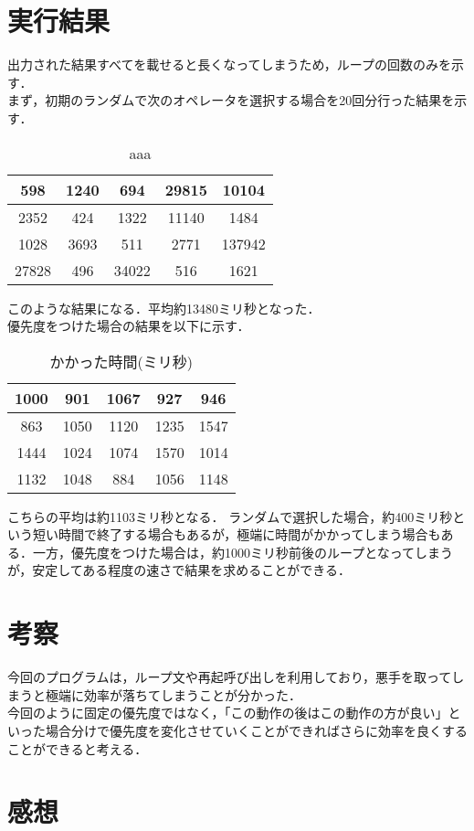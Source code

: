 \documentclass[a4j]{jarticle}
\begin{document}
\section{実行結果}
出力された結果すべてを載せると長くなってしまうため，ループの回数のみを示す．\\
まず，初期のランダムで次のオペレータを選択する場合を20回分行った結果を示す．\\
\begin{table}[H]
\caption{aaa}
\begin{center}
\begin{tabular}{|c|c|c|c|c|}
\hline
598  & 1240  & 694    & 29815 & 10104   \\ \hline
2352   & 424  & 1322    & 11140  & 1484   \\ \hline
1028   & 3693  & 511  & 2771 & 137942  \\ \hline
27828   & 496 & 34022   & 516  & 1621 \\ \hline
\end{tabular}
\end{center}
\end{table}
このような結果になる．平均約13480ミリ秒となった．\\
優先度をつけた場合の結果を以下に示す．
\begin{table}[H]
\caption{かかった時間(ミリ秒)}
\begin{center}
\begin{tabular}{|c|c|c|c|c|}
\hline
1000  & 901  & 1067 & 927 & 946   \\ \hline
863  & 1050  & 1120 & 1235 & 1547 \\ \hline
1444   & 1024 & 1074 & 1570 & 1014  \\ \hline
1132   & 1048 & 884  & 1056  & 1148 \\ \hline
\end{tabular}
\end{center}
\end{table}
こちらの平均は約1103ミリ秒となる．
ランダムで選択した場合，約400ミリ秒という短い時間で終了する場合もあるが，極端に時間がかかってしまう場合もある．一方，優先度をつけた場合は，約1000ミリ秒前後のループとなってしまうが，安定してある程度の速さで結果を求めることができる．
\section{考察}
今回のプログラムは，ループ文や再起呼び出しを利用しており，悪手を取ってしまうと極端に効率が落ちてしまうことが分かった．\\
今回のように固定の優先度ではなく，「この動作の後はこの動作の方が良い」といった場合分けで優先度を変化させていくことができればさらに効率を良くすることができると考える．

\section{感想}
\end{document}
